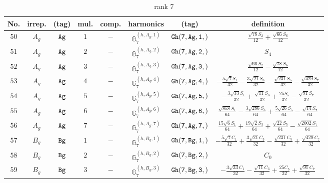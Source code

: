 \documentclass[fleqn,8pt]{jsarticle}
\begin{document}
\begin{table}[ht!]
\begin{center}
\caption{rank 7}
\renewcommand{\arraystretch}{1.3}
\begin{tabular}{cccccccc} \hline \hline
No. & irrep. & (tag) & mul. & comp. & harmonics & (tag) & definition \\ \hline
$ 50 $ & $ A_{g} $ & $ {\tt Ag} $ & $ 1 $ & $ - $ & $ \mathbb{G}_{7}^{(h,A_{g},1)} $ & $ {\tt Gh(7,Ag,1,)} $ & $ \frac{\sqrt{78} S_{2}}{12} + \frac{\sqrt{66} S_{6}}{12} $ \\
$ 51 $ & $ A_{g} $ & $ {\tt Ag} $ & $ 2 $ & $ - $ & $ \mathbb{G}_{7}^{(h,A_{g},2)} $ & $ {\tt Gh(7,Ag,2,)} $ & $ S_{4} $ \\
$ 52 $ & $ A_{g} $ & $ {\tt Ag} $ & $ 3 $ & $ - $ & $ \mathbb{G}_{7}^{(h,A_{g},3)} $ & $ {\tt Gh(7,Ag,3,)} $ & $ \frac{\sqrt{66} S_{2}}{12} - \frac{\sqrt{78} S_{6}}{12} $ \\
$ 53 $ & $ A_{g} $ & $ {\tt Ag} $ & $ 4 $ & $ - $ & $ \mathbb{G}_{7}^{(h,A_{g},4)} $ & $ {\tt Gh(7,Ag,4,)} $ & $ - \frac{5 \sqrt{7} S_{1}}{32} - \frac{3 \sqrt{21} S_{3}}{32} - \frac{\sqrt{231} S_{5}}{32} - \frac{\sqrt{429} S_{7}}{32} $ \\
$ 54 $ & $ A_{g} $ & $ {\tt Ag} $ & $ 5 $ & $ - $ & $ \mathbb{G}_{7}^{(h,A_{g},5)} $ & $ {\tt Gh(7,Ag,5,)} $ & $ - \frac{3 \sqrt{33} S_{1}}{32} + \frac{\sqrt{11} S_{3}}{32} + \frac{25 S_{5}}{32} - \frac{\sqrt{91} S_{7}}{32} $ \\
$ 55 $ & $ A_{g} $ & $ {\tt Ag} $ & $ 6 $ & $ - $ & $ \mathbb{G}_{7}^{(h,A_{g},6)} $ & $ {\tt Gh(7,Ag,6,)} $ & $ \frac{\sqrt{858} S_{1}}{64} - \frac{3 \sqrt{286} S_{3}}{64} + \frac{5 \sqrt{26} S_{5}}{64} - \frac{\sqrt{14} S_{7}}{64} $ \\
$ 56 $ & $ A_{g} $ & $ {\tt Ag} $ & $ 7 $ & $ - $ & $ \mathbb{G}_{7}^{(h,A_{g},7)} $ & $ {\tt Gh(7,Ag,7,)} $ & $ \frac{15 \sqrt{6} S_{1}}{64} + \frac{19 \sqrt{2} S_{3}}{64} + \frac{\sqrt{22} S_{5}}{64} - \frac{\sqrt{2002} S_{7}}{64} $ \\
$ 57 $ & $ B_{g} $ & $ {\tt Bg} $ & $ 1 $ & $ - $ & $ \mathbb{G}_{7}^{(h,B_{g},1)} $ & $ {\tt Gh(7,Bg,1,)} $ & $ - \frac{5 \sqrt{7} C_{1}}{32} + \frac{3 \sqrt{21} C_{3}}{32} - \frac{\sqrt{231} C_{5}}{32} + \frac{\sqrt{429} C_{7}}{32} $ \\
$ 58 $ & $ B_{g} $ & $ {\tt Bg} $ & $ 2 $ & $ - $ & $ \mathbb{G}_{7}^{(h,B_{g},2)} $ & $ {\tt Gh(7,Bg,2,)} $ & $ C_{0} $ \\
$ 59 $ & $ B_{g} $ & $ {\tt Bg} $ & $ 3 $ & $ - $ & $ \mathbb{G}_{7}^{(h,B_{g},3)} $ & $ {\tt Gh(7,Bg,3,)} $ & $ - \frac{3 \sqrt{33} C_{1}}{32} - \frac{\sqrt{11} C_{3}}{32} + \frac{25 C_{5}}{32} + \frac{\sqrt{91} C_{7}}{32} $ \\

\end{tabular}
\end{center}
\end{table}
\end{document}
